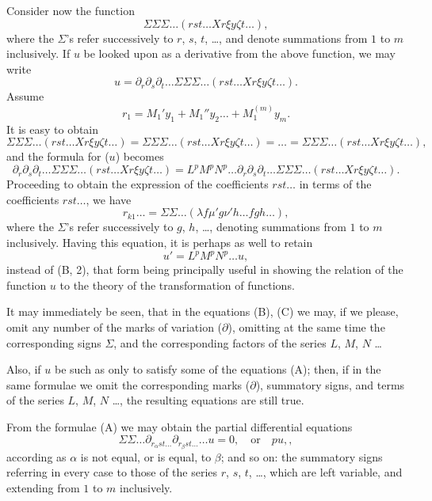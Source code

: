 \documentclass[11pt,a4paper]{book}
\begin{document}
Consider now the function
\[
\Sigma \Sigma \Sigma \ldots (rst\ldots X r\xi y\zeta t\ldots)
\tag{19},
\]
where the $\Sigma$'s refer successively to $r$, $s$, $t$, \ldots, and denote summations from $1$ to $m$
inclusively. If $u$ be looked upon as a derivative from the above function, we may write
\[
u = \partial_r \partial_s \partial_t \ldots \Sigma\Sigma\Sigma\ldots(rst\ldots X r\xi y\zeta t\ldots)
\tag{20}.
\]
Assume
\[
r_1 = M_1' y_1 + M_1'' y_2 \ldots + M_1^{(m)} y_m
\tag{21}.
\]
It is easy to obtain
\[
\Sigma \Sigma \Sigma \ldots (rst\ldots X r\xi y\zeta t\ldots) = \Sigma \Sigma \Sigma \ldots (rst\ldots X r\xi y\zeta t\ldots) = \ldots
= \Sigma \Sigma \Sigma \ldots (rst\ldots X r\xi y\zeta t\ldots)
\tag{22},
\]
and the formula for ($u$) becomes
\[
\partial_r \partial_s \partial_t \ldots \Sigma\Sigma\Sigma\ldots(rst\ldots X r\xi y\zeta t\ldots) = L^p M^p N^p \ldots
\partial_r \partial_s \partial_t \ldots \Sigma\Sigma\Sigma\ldots(rst\ldots X r\xi y\zeta t\ldots)
\tag{B, 2}.
\]
Proceeding to obtain the expression of the coefficients $rst\ldots$ in terms of the
coefficients $rst\ldots$, we have
\[
r_{k1}\ldots = \Sigma \Sigma \ldots (\lambda f \mu' g \nu' h \ldots fgh\ldots)
\tag{C},
\]
where the $\Sigma$'s refer successively to $g$, $h$, \ldots, denoting summations from $1$ to $m$
inclusively. Having this equation, it is perhaps as well to retain
\[
u' = L^p M^p N^p \ldots u
\tag{B, 1},
\]
instead of (B, 2), that form being principally useful in showing the relation of the
function $u$ to the theory of the transformation of functions.

It may immediately be seen, that in the equations (B), (C) we may, if we please,
omit any number of the marks of variation ($\partial$), omitting at the same time the
corresponding signs $\Sigma$, and the corresponding factors of the series $L$, $M$, $N$ \ldots

Also, if $u$ be such as only to satisfy some of the equations (A); then, if in the
same formulae we omit the corresponding marks ($\partial$), summatory signs, and terms of the
series $L$, $M$, $N$ \ldots, the resulting equations are still true.

From the formulae (A) we may obtain the partial differential equations
\[
\Sigma \Sigma \ldots \partial_{r_\alpha st\ldots} \partial_{r_\beta st\ldots} \ldots u = 0, \quad \text{or} \quad pu,
\tag{D},
\]
according as $\alpha$ is not equal, or is equal, to $\beta$;
and so on: the summatory signs referring in every case to those of the series $r$, $s$, $t$, \ldots,
which are left variable, and extending from $1$ to $m$ inclusively.
\end{document}
